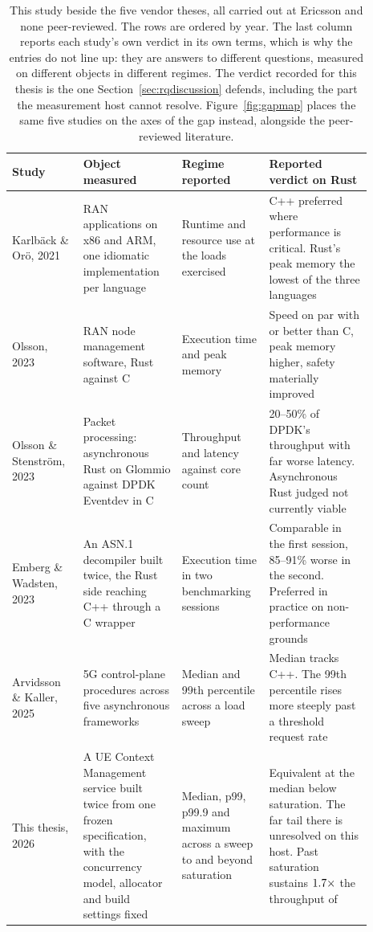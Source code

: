 \documentclass[english,twoside,openright,a4paper,censored,csm,software-track-2020]{HYthesisML}
\begin{document}
\begin{table}[H]
\centering
\small
\caption[This study beside the five vendor theses]{This study beside the five vendor theses, all
carried out at Ericsson and none peer-reviewed. The rows are ordered by year. The last column
reports each study's own verdict in its own terms, which is why the entries do not line up: they
are answers to different questions, measured on different objects in different regimes. The
verdict recorded for this thesis is the one Section~\ref{sec:rqdiscussion} defends, including the
part the measurement host cannot resolve. Figure~\ref{fig:gapmap} places the same five studies on
the axes of the gap instead, alongside the peer-reviewed
literature.\label{tab:vendortheses}}
\renewcommand{\arraystretch}{1.2}
\begin{tabular}{@{}R{0.18\linewidth} R{0.25\linewidth} R{0.20\linewidth} R{0.26\linewidth}@{}}
\hline\hline
Study & Object measured & Regime reported & Reported verdict on Rust \\
\hline
Karlb\"ack \& Or\"o, 2021~\cite{karlback2021ran} &
RAN applications on x86 and ARM, one idiomatic implementation per language &
Runtime and resource use at the loads exercised &
C++ preferred where performance is critical. Rust's peak memory the lowest of the three
languages \\
Olsson, 2023~\cite{olsson2023ranmgmt} &
RAN node management software, Rust against C &
Execution time and peak memory &
Speed on par with or better than C, peak memory higher, safety materially improved \\
Olsson \& Stenstr\"om, 2023~\cite{olsson2023asyncpackets} &
Packet processing: asynchronous Rust on Glommio against DPDK Eventdev in C &
Throughput and latency against core count &
20--50\% of DPDK's throughput with far worse latency. Asynchronous Rust judged not currently
viable \\
Emberg \& Wadsten, 2023~\cite{emberg2023asn1} &
An {ASN.1} decompiler built twice, the Rust side reaching C++ through a C wrapper &
Execution time in two benchmarking sessions &
Comparable in the first session, 85--91\% worse in the second. Preferred in practice on
non-performance grounds \\
Arvidsson \& Kaller, 2025~\cite{arvidsson2025async} &
5G control-plane procedures across five asynchronous frameworks &
Median and 99th percentile across a load sweep &
Median tracks C++. The 99th percentile rises more steeply past a threshold request rate \\
\hline
This thesis, 2026 &
A UE Context Management service built twice from one frozen specification, with the concurrency
model, allocator and build settings fixed &
Median, p99, p99.9 and maximum across a sweep to and beyond saturation &
Equivalent at the median below saturation. The far tail there is unresolved on this host. Past
saturation \OverloadSustainedFaster{} sustains $1.7\times$ the throughput of
\OverloadSustainedSlower{} \\
\hline
\end{tabular}
\end{table}
\end{document}
